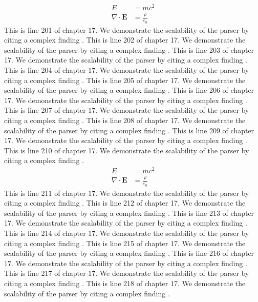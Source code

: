 \begin{align*}
  E &= mc^2 \\
  \nabla \cdot \mathbf{E} &= \frac{\rho}{\varepsilon_0}
\end{align*}
This is line 201 of chapter 17. We demonstrate the scalability of the parser by citing a complex finding \cite{ref17_201}.
This is line 202 of chapter 17. We demonstrate the scalability of the parser by citing a complex finding \cite{ref17_202}.
This is line 203 of chapter 17. We demonstrate the scalability of the parser by citing a complex finding \cite{ref17_203}.
This is line 204 of chapter 17. We demonstrate the scalability of the parser by citing a complex finding \cite{ref17_204}.
This is line 205 of chapter 17. We demonstrate the scalability of the parser by citing a complex finding \cite{ref17_205}.
This is line 206 of chapter 17. We demonstrate the scalability of the parser by citing a complex finding \cite{ref17_206}.
This is line 207 of chapter 17. We demonstrate the scalability of the parser by citing a complex finding \cite{ref17_207}.
This is line 208 of chapter 17. We demonstrate the scalability of the parser by citing a complex finding \cite{ref17_208}.
This is line 209 of chapter 17. We demonstrate the scalability of the parser by citing a complex finding \cite{ref17_209}.
This is line 210 of chapter 17. We demonstrate the scalability of the parser by citing a complex finding \cite{ref17_210}.
\begin{align*}
  E &= mc^2 \\
  \nabla \cdot \mathbf{E} &= \frac{\rho}{\varepsilon_0}
\end{align*}
This is line 211 of chapter 17. We demonstrate the scalability of the parser by citing a complex finding \cite{ref17_211}.
This is line 212 of chapter 17. We demonstrate the scalability of the parser by citing a complex finding \cite{ref17_212}.
This is line 213 of chapter 17. We demonstrate the scalability of the parser by citing a complex finding \cite{ref17_213}.
This is line 214 of chapter 17. We demonstrate the scalability of the parser by citing a complex finding \cite{ref17_214}.
This is line 215 of chapter 17. We demonstrate the scalability of the parser by citing a complex finding \cite{ref17_215}.
This is line 216 of chapter 17. We demonstrate the scalability of the parser by citing a complex finding \cite{ref17_216}.
This is line 217 of chapter 17. We demonstrate the scalability of the parser by citing a complex finding \cite{ref17_217}.
This is line 218 of chapter 17. We demonstrate the scalability of the parser by citing a complex finding \cite{ref17_218}.
